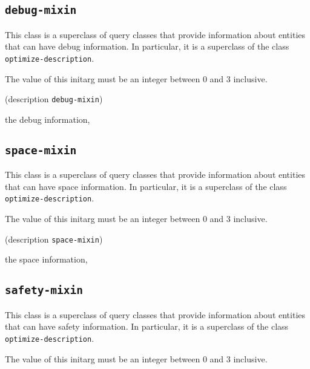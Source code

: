 \subsection{\texttt{debug-mixin}}
\label{sec-debug-mixin}

{\footnotesize
{}
}
This class is a superclass of query classes that provide information
about entities that can have debug information.  In particular, it is a
superclass of the class \texttt{optimize-description}.

{\footnotesize
{}
}

The value of this initarg must be an integer between $0$ and $3$
inclusive.

{\footnotesize
{} {(description {\tt debug-mixin})}
}

 the debug information, 

\subsection{\texttt{space-mixin}}
\label{sec-space-mixin}

{\footnotesize
{}
}

This class is a superclass of query classes that provide information
about entities that can have space information.  In particular, it is a
superclass of the class \texttt{optimize-description}.

{\footnotesize
{}
}

The value of this initarg must be an integer between $0$ and $3$
inclusive.

{\footnotesize
{} {(description {\tt space-mixin})}
}

 the space information, 

\subsection{\texttt{safety-mixin}}
\label{sec-safety-mixin}

{\footnotesize
{}
}

This class is a superclass of query classes that provide information
about entities that can have safety information.  In particular, it is a
superclass of the class \texttt{optimize-description}.

{\footnotesize
{}
}

The value of this initarg must be an integer between $0$ and $3$
inclusive.

